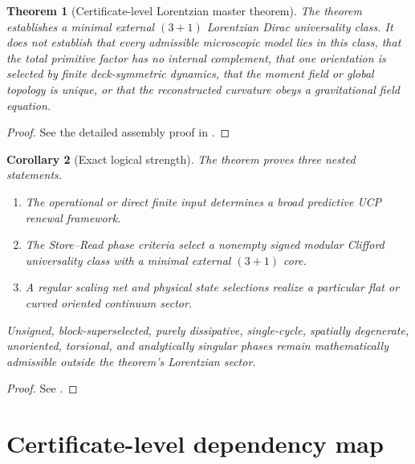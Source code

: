 \documentclass[11pt]{article}
\newtheorem{theorem}{Theorem}[section]
\newtheorem{corollary}[theorem]{Corollary}
\theoremstyle{definition}
\theoremstyle{remark}
\begin{document}
\begin{theorem}[Certificate-level Lorentzian master theorem]
The theorem establishes a minimal external $(3+1)$ Lorentzian Dirac
universality class.  It does not establish that every admissible microscopic
model lies in this class, that the total primitive factor has no internal
complement, that one orientation is selected by finite deck-symmetric dynamics,
that the moment field or global topology is unique, or that the reconstructed
curvature obeys a gravitational field equation.
\end{theorem}

\begin{proof}
See the detailed assembly proof in .
\end{proof}

\begin{corollary}[Exact logical strength]
\label{cor:logical-strength}
The theorem proves three nested statements.
\begin{enumerate}[label=\textup{(\alph*)},leftmargin=2.7em]
\item The operational or direct finite input determines a broad predictive UCP
      renewal framework.
\item The Store--Read phase criteria select a nonempty signed modular Clifford
      universality class with a minimal external $(3+1)$ core.
\item A regular scaling net and physical state selections realize a particular
      flat or curved oriented continuum sector.
\end{enumerate}
Unsigned, block-superselected, purely dissipative, single-cycle, spatially
degenerate, unoriented, torsional, and analytically singular phases remain
mathematically admissible outside the theorem's Lorentzian sector.
\end{corollary}

\begin{proof}
See .
\end{proof}

\section{Certificate-level dependency map}
\end{document}
